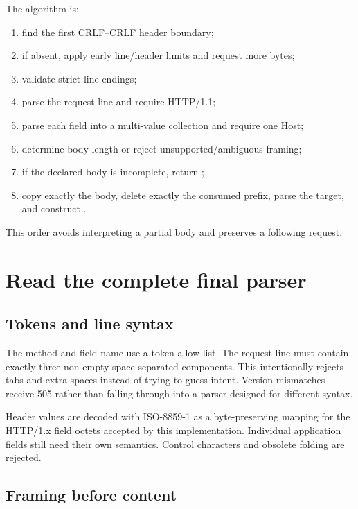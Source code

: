 The algorithm is:

\begin{enumerate}
  \item find the first CRLF--CRLF header boundary;
  \item if absent, apply early line/header limits and request more bytes;
  \item validate strict line endings;
  \item parse the request line and require HTTP/1.1;
  \item parse each field into a multi-value collection and require one Host;
  \item determine body length or reject unsupported/ambiguous framing;
  \item if the declared body is incomplete, return ;
  \item copy exactly the body, delete exactly the consumed prefix, parse the
        target, and construct .
\end{enumerate}

This order avoids interpreting a partial body and preserves a following request.

\section{Read the complete final parser}


\subsection{Tokens and line syntax}

The method and field name use a token allow-list. The request line must contain
exactly three non-empty space-separated components. This intentionally rejects
tabs and extra spaces instead of trying to guess intent. Version mismatches
receive 505 rather than falling through into a parser designed for different
syntax.

Header values are decoded with ISO-8859-1 as a byte-preserving mapping for the
HTTP/1.x field octets accepted by this implementation. Individual application
fields still need their own semantics. Control characters and obsolete folding
are rejected.

\subsection{Framing before content}

